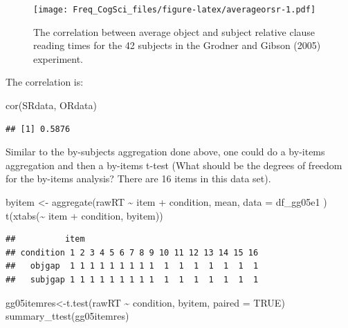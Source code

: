 \documentclass[
  12pt,
]{krantz}
\newenvironment{Shaded}{\begin{snugshade}}{\end{snugshade}}
\newcommand{\AttributeTok}[1]{\textcolor[rgb]{0.77,0.63,0.00}{#1}}
\newcommand{\ConstantTok}[1]{\textcolor[rgb]{0.00,0.00,0.00}{#1}}
\newcommand{\FunctionTok}[1]{\textcolor[rgb]{0.00,0.00,0.00}{#1}}
\newcommand{\NormalTok}[1]{#1}
\newcommand{\OtherTok}[1]{\textcolor[rgb]{0.56,0.35,0.01}{#1}}
\newcommand{\SpecialCharTok}[1]{\textcolor[rgb]{0.00,0.00,0.00}{#1}}
\theoremstyle{definition}
\theoremstyle{definition}
\theoremstyle{definition}
\theoremstyle{definition}
\theoremstyle{remark}
\begin{document}
\begin{figure}
\centering
\texttt{[image: Freq\_CogSci\_files/figure-latex/averageorsr-1.pdf]}
\caption{\label{fig:averageorsr}The correlation between average object and subject relative clause reading times for the 42 subjects in the Grodner and Gibson (2005) experiment.}
\end{figure}

The correlation is:

\begin{Shaded}
\begin{Highlighting}[]
\FunctionTok{cor}\NormalTok{(SRdata, ORdata)}
\end{Highlighting}
\end{Shaded}

\begin{verbatim}
## [1] 0.5876
\end{verbatim}

Similar to the by-subjects aggregation done above, one could do a by-items aggregation and then a by-items t-test (What should be the degrees of freedom for the by-items analysis? There are 16 items in this data set).

\begin{Shaded}
\begin{Highlighting}[]
\NormalTok{byitem }\OtherTok{\textless{}{-}} \FunctionTok{aggregate}\NormalTok{(rawRT }\SpecialCharTok{\textasciitilde{}}\NormalTok{ item }\SpecialCharTok{+}\NormalTok{ condition,}
\NormalTok{  mean,}
  \AttributeTok{data =}\NormalTok{ df\_gg05e1}
\NormalTok{)}
\FunctionTok{t}\NormalTok{(}\FunctionTok{xtabs}\NormalTok{(}\SpecialCharTok{\textasciitilde{}}\NormalTok{ item }\SpecialCharTok{+}\NormalTok{ condition, byitem))}
\end{Highlighting}
\end{Shaded}

\begin{verbatim}
##          item
## condition 1 2 3 4 5 6 7 8 9 10 11 12 13 14 15 16
##   objgap  1 1 1 1 1 1 1 1 1  1  1  1  1  1  1  1
##   subjgap 1 1 1 1 1 1 1 1 1  1  1  1  1  1  1  1
\end{verbatim}

\begin{Shaded}
\begin{Highlighting}[]
\NormalTok{gg05itemres}\OtherTok{\textless{}{-}}\FunctionTok{t.test}\NormalTok{(rawRT }\SpecialCharTok{\textasciitilde{}}\NormalTok{ condition, }
\NormalTok{                    byitem, }\AttributeTok{paired =} \ConstantTok{TRUE}\NormalTok{)}
\FunctionTok{summary\_ttest}\NormalTok{(gg05itemres)}
\end{Highlighting}
\end{Shaded}
\end{document}
